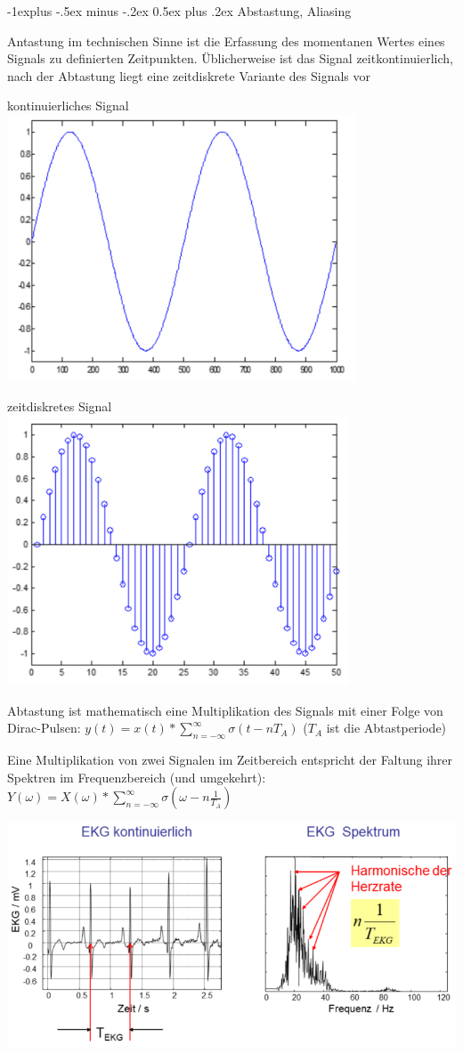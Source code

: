 \documentclass[a4paper]{article}
\makeatletter
\renewcommand{\subsection}{\@startsection{subsection}{2}{0mm}%
 {-1explus -.5ex minus -.2ex}%
 {0.5ex plus .2ex}%
 {\normalfont\normalsize\bfseries}}
\makeatother
\begin{document}
\begin{multicols}{3}
  \subsection{Abstastung, Aliasing}\label{abstastung-aliasing}

  Antastung im technischen Sinne ist die Erfassung des momentanen Wertes
  eines Signals zu definierten Zeitpunkten. Üblicherweise ist das Signal
  zeitkontinuierlich, nach der Abtastung liegt eine zeitdiskrete Variante
  des Signals vor

  \begin{itemize*}
    \item kontinuierliches Signal \includegraphics[width=.5\linewidth]{Assets/Biosignalverarbeitung-kontinuierliches-signal.png}
    \item zeitdiskretes Signal \includegraphics[width=.5\linewidth]{Assets/Biosignalverarbeitung-zeitdiskretes-signal.png}
  \end{itemize*}

  Abtastung ist mathematisch eine Multiplikation des Signals mit einer
  Folge von Dirac-Pulsen:
  $y(t)=x(t)*\sum_{n=-\infty}^{\infty}\sigma(t-nT_A)$
  ($T_A$ ist die Abtastperiode)

  Eine Multiplikation von zwei Signalen im Zeitbereich entspricht der
  Faltung ihrer Spektren im Frequenzbereich (und umgekehrt):
  $Y(\omega)=X(\omega)*\sum_{n=-\infty}^{\infty} \sigma(\omega-n\frac{1}{T_A})$

  \includegraphics[width=.5\linewidth]{Assets/Biosignalverarbeitung-EKG-kontinuierlich-spektrum.png}


\end{multicols}
\end{document}
